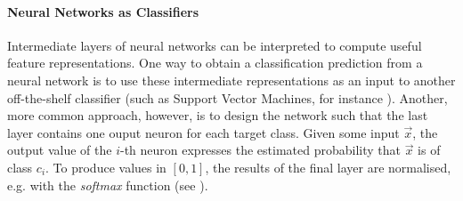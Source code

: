 \documentclass[
	fontsize=10pt, %
	twoside=false, %
	secnumdepth=1, %
  toc=indentunnumbered %
]{kaobook}
\begin{document}








\paragraph{Neural Networks as Classifiers} Intermediate layers of neural
networks can be interpreted to compute useful feature representations. One way
to obtain a classification prediction from a neural network is to use these
intermediate representations as an input to another off-the-shelf classifier
(such as Support Vector Machines, for instance
\cite{liu_CombiningConvolutionalNeural_2018}). Another, more common approach,
however, is to design the network such that the last layer contains one ouput
neuron for each target class. Given some input $\vec x$, the output value of the
$i$-th neuron expresses the estimated probability that $\vec x$ is of class
$c_i$. To produce values in $[0,1]$, the results of the final layer are
normalised, e.g. with the \textit{softmax} function (see ).
\end{document}
